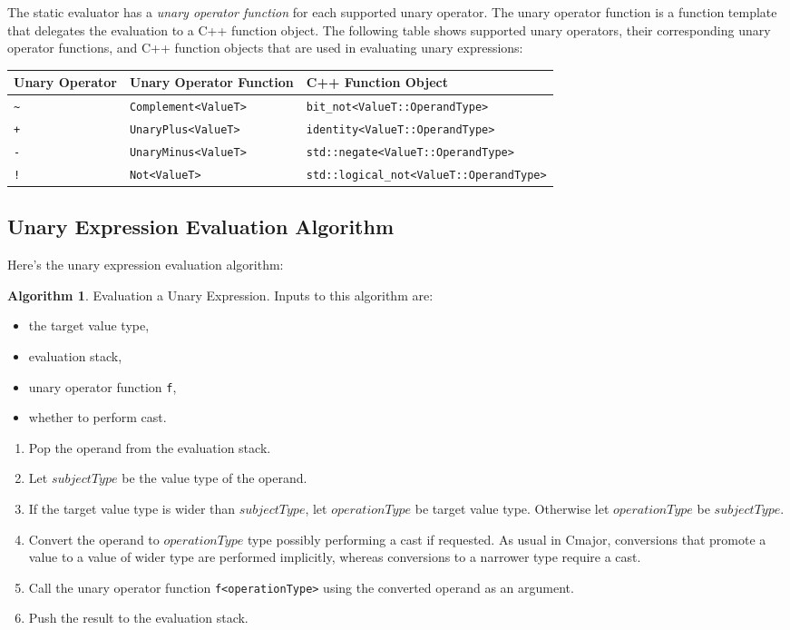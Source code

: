 \documentclass[a4paper,oneside,11pt]{book}
\theoremstyle{definition}
\newtheorem{algo}{Algorithm}[section]
\begin{document}
The static evaluator has a \emph{unary operator function} for each supported unary operator.
The unary operator function is a function template that delegates the evaluation to a C++ function object.
The following table shows supported unary operators, their corresponding unary operator functions, and
C++ function objects that are used in evaluating unary expressions:

\begin{flushleft}
\begin{supertabular}{lll}
\textbf{Unary Operator}& \textbf{Unary Operator Function}& \textbf{C++ Function Object}\\
\hline
\verb|~|& \verb|Complement<ValueT>|& \verb|bit_not<ValueT::OperandType>|\\
\verb|+|& \verb|UnaryPlus<ValueT>|& \verb|identity<ValueT::OperandType>|\\
\verb|-|& \verb|UnaryMinus<ValueT>|& \verb|std::negate<ValueT::OperandType>|\\
\verb|!|& \verb|Not<ValueT>|& \verb|std::logical_not<ValueT::OperandType>|\\
\hline
\end{supertabular}
\end{flushleft}

\clearpage
\subsection{Unary Expression Evaluation Algorithm}

Here's the unary expression evaluation algorithm:

\begin{algo}\label{unaryexpreval} Evaluation a Unary Expression.
Inputs to this algorithm are:
\begin{itemize}
\item
the target value type,
\item
evaluation stack,
\item
unary operator function \verb|f|,
\item
whether to perform cast.
\end{itemize}

\begin{enumerate}
\item
Pop the operand from the evaluation stack.
\item
Let $subjectType$ be the value type of the operand.
\item
If the target value type is wider than $subjectType$, let $operationType$ be target value type.
Otherwise let $operationType$ be $subjectType$.
\item
Convert the operand to $operationType$ type possibly performing a cast if requested.
As usual in Cmajor, conversions that promote a value to a value of wider type are performed implicitly,
whereas conversions to a narrower type require a cast.
\item
Call the unary operator function \verb|f<operationType>| using the converted operand as an argument.
\item
Push the result to the evaluation stack.
\end{enumerate}
\end{algo}
\end{document}
